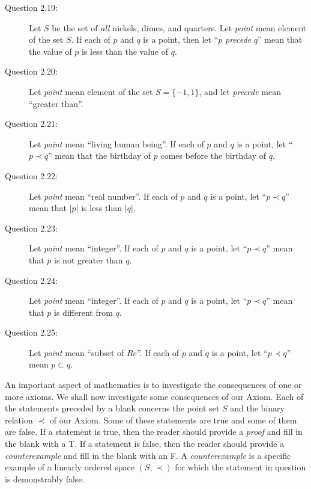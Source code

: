 \documentclass{book}
\begin{document}
\begin{description}

\item[Question 2.19:] Let $S$ be the set of \emph{all} nickels, dimes, and quarters. Let \emph{point} mean element of the set $S$. If each of $p$ and $q$ is a point, then let ``$p$ \emph{precede} $q$'' mean that the value of $p$ is less than the value of $q$.

\item[Question 2.20:] Let \emph{point} mean element of the set $S = \{ -1, 1 \}$, and let \emph{precede} mean ``greater than''.

\item[Question 2.21:] Let \emph{point} mean ``living human being''. If each of $p$ and $q$ is a point, let ``$p \prec q$'' mean that the birthday of $p$ comes before the birthday of $q$.

\item[Question 2.22:] Let \emph{point} mean ``real number''. If each of $p$ and $q$ is a point, let ``$p \prec q$'' mean that $\vert p \vert$ is less than $\vert q \vert$.

\item[Question 2.23:] Let \emph{point} mean ``integer''. If each of $p$ and $q$ is a point, let ``$p \prec q$'' mean that $p$ is not greater than $q$.

\item[Question 2.24:] Let \emph{point} mean ``integer''. If each of $p$ and $q$ is a point, let ``$p \prec q$'' mean that $p$ is different from $q$.

\item[Question 2.25:] Let \emph{point} mean ``subset of $Re$''. If each of $p$ and $q$ is a point, let ``$p \prec q$'' mean $p \subset q$.

\end{description}

An important aspect of mathematics is to investigate the consequences of one or more axioms. We shall now investigate some consequences of our Axiom. Each of the statements preceded by a blank concerns the point set $S$ and the binary relation $\prec$ of our Axiom. Some of these statements are true and some of them are false. If a statement is true, then the reader should provide a \emph{proof} and fill in the blank with a T. If a statement is false, then the reader should provide a \emph{counterexample} and fill in the blank with an F. A \emph{counterexample} is a specific example of a linearly ordered space $(S, \prec)$ for which the statement in question is demonstrably false.
\end{document}
